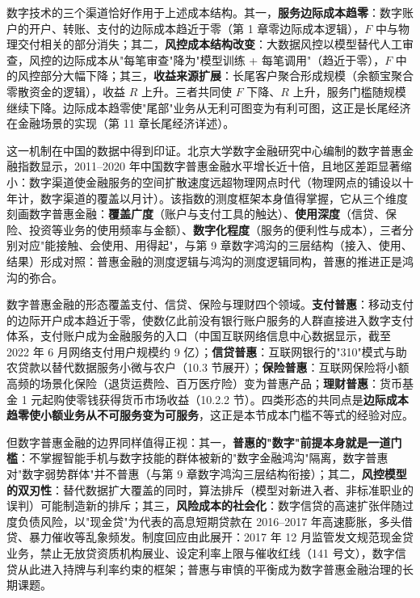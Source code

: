 数字技术的三个渠道恰好作用于上述成本结构。其一，\textbf{服务边际成本趋零}：数字账户的开户、转账、支付的边际成本趋近于零（第 1 章零边际成本逻辑），$F$ 中与物理交付相关的部分消失；其二，\textbf{风控成本结构改变}：大数据风控以模型替代人工审查，风控的边际成本从"每笔审查"降为"模型训练 + 每笔调用"（趋近于零），$F$ 中的风控部分大幅下降；其三，\textbf{收益来源扩展}：长尾客户聚合形成规模（余额宝聚合零散资金的逻辑），收益 $R$ 上升。三者共同使 $F$ 下降、$R$ 上升，服务门槛随规模继续下降。边际成本趋零使"尾部"业务从无利可图变为有利可图，这正是长尾经济在金融场景的实现（第 11 章长尾经济详述）。

这一机制在中国的数据中得到印证。北京大学数字金融研究中心编制的数字普惠金融指数显示，2011--2020 年中国数字普惠金融水平增长近十倍，且地区差距显著缩小：数字渠道使金融服务的空间扩散速度远超物理网点时代（物理网点的铺设以十年计，数字渠道的覆盖以月计）。该指数的测度框架本身值得掌握，它从三个维度刻画数字普惠金融：\textbf{覆盖广度}（账户与支付工具的触达）、\textbf{使用深度}（信贷、保险、投资等业务的使用频率与金额）、\textbf{数字化程度}（服务的便利性与成本），三者分别对应"能接触、会使用、用得起"，与第 9 章数字鸿沟的三层结构（接入、使用、结果）形成对照：普惠金融的测度逻辑与鸿沟的测度逻辑同构，普惠的推进正是鸿沟的弥合。

数字普惠金融的形态覆盖支付、信贷、保险与理财四个领域。\textbf{支付普惠}：移动支付的边际开户成本趋近于零，使数亿此前没有银行账户服务的人群直接进入数字支付体系，支付账户成为金融服务的入口（中国互联网络信息中心数据显示，截至 2022 年 6 月网络支付用户规模约 9 亿）；\textbf{信贷普惠}：互联网银行的"310"模式与助农贷款以替代数据服务小微与农户（10.3 节展开）；\textbf{保险普惠}：互联网保险将小额高频的场景化保险（退货运费险、百万医疗险）变为普惠产品；\textbf{理财普惠}：货币基金 1 元起购使零钱获得货币市场收益（10.2.2 节）。四类形态的共同点是\textbf{边际成本趋零使小额业务从不可服务变为可服务}，这正是本节成本门槛不等式的经验对应。

但数字普惠金融的边界同样值得正视：其一，\textbf{普惠的"数字"前提本身就是一道门槛}：不掌握智能手机与数字技能的群体被新的"数字金融鸿沟"隔离，数字普惠对"数字弱势群体"并不普惠（与第 9 章数字鸿沟三层结构衔接）；其二，\textbf{风控模型的双刃性}：替代数据扩大覆盖的同时，算法排斥（模型对新进入者、非标准职业的误判）可能制造新的排斥；其三，\textbf{风险成本的社会化}：数字信贷的高速扩张伴随过度负债风险，以"现金贷"为代表的高息短期贷款在 2016--2017 年高速膨胀，多头借贷、暴力催收等乱象频发。制度回应由此展开：2017 年 12 月监管发文规范现金贷业务，禁止无放贷资质机构展业、设定利率上限与催收红线（141 号文），数字信贷从此进入持牌与利率约束的框架；普惠与审慎的平衡成为数字普惠金融治理的长期课题。

